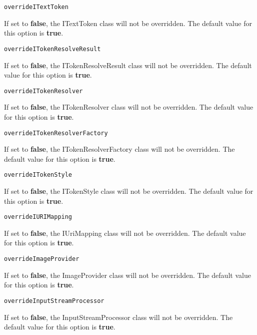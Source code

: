 \noindent\texttt{overrideITextToken}
\begin{myindentpar}{1cm}
If set to \textbf{false}, the ITextToken class will not be overridden. The default value for this option is \textbf{true}.
\end{myindentpar}

\noindent\texttt{overrideITokenResolveResult}
\begin{myindentpar}{1cm}
If set to \textbf{false}, the ITokenResolveResult class will not be overridden. The default value for this option is \textbf{true}.
\end{myindentpar}

\noindent\texttt{overrideITokenResolver}
\begin{myindentpar}{1cm}
If set to \textbf{false}, the ITokenResolver class will not be overridden. The default value for this option is \textbf{true}.
\end{myindentpar}

\noindent\texttt{overrideITokenResolverFactory}
\begin{myindentpar}{1cm}
If set to \textbf{false}, the ITokenResolverFactory class will not be overridden. The default value for this option is \textbf{true}.
\end{myindentpar}

\noindent\texttt{overrideITokenStyle}
\begin{myindentpar}{1cm}
If set to \textbf{false}, the ITokenStyle class will not be overridden. The default value for this option is \textbf{true}.
\end{myindentpar}

\noindent\texttt{overrideIURIMapping}
\begin{myindentpar}{1cm}
If set to \textbf{false}, the IUriMapping class will not be overridden. The default value for this option is \textbf{true}.
\end{myindentpar}

\noindent\texttt{overrideImageProvider}
\begin{myindentpar}{1cm}
If set to \textbf{false}, the ImageProvider class will not be overridden. The default value for this option is \textbf{true}.
\end{myindentpar}

\noindent\texttt{overrideInputStreamProcessor}
\begin{myindentpar}{1cm}
If set to \textbf{false}, the InputStreamProcessor class will not be overridden. The default value for this option is \textbf{true}.
\end{myindentpar}

